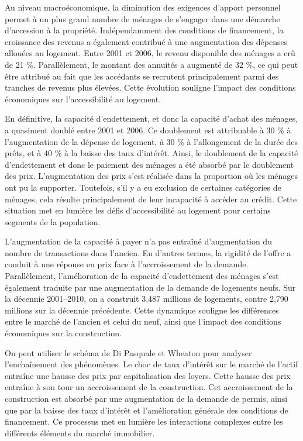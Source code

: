 \documentclass[a4paper, 12pt]{report}
\begin{document}
Au niveau macroéconomique, la diminution des exigences d'apport personnel permet à un plus grand nombre de ménages de s'engager dans une démarche d'accession à la propriété. Indépendamment des conditions de financement, la croissance des revenus a également contribué à une augmentation des dépenses allouées au logement. Entre 2001 et 2006, le revenu disponible des ménages a crû de 21 \%. Parallèlement, le montant des annuités a augmenté de 32 \%, ce qui peut être attribué au fait que les accédants se recrutent principalement parmi des tranches de revenus plus élevées. Cette évolution souligne l'impact des conditions économiques sur l'accessibilité au logement.


En définitive, la capacité d'endettement, et donc la capacité d'achat des ménages, a quasiment doublé entre 2001 et 2006. Ce doublement est attribuable à 30 \% à l'augmentation de la dépense de logement, à 30 \% à l'allongement de la durée des prêts, et à 40 \% à la baisse des taux d'intérêt. Ainsi, le doublement de la capacité d'endettement et donc le paiement des ménages a été absorbé par le doublement des prix. L'augmentation des prix s'est réalisée dans la proportion où les ménages ont pu la supporter. Toutefois, s'il y a eu exclusion de certaines catégories de ménages, cela résulte principalement de leur incapacité à accéder au crédit. Cette situation met en lumière les défis d'accessibilité au logement pour certains segments de la population.

L'augmentation de la capacité à payer n'a pas entraîné d'augmentation du nombre de transactions dans l'ancien. En d'autres termes, la rigidité de l'offre a conduit à une réponse en prix face à l'accroissement de la demande. Parallèlement, l'amélioration de la capacité d'endettement des ménages s'est également traduite par une augmentation de la demande de logements neufs. Sur la décennie 2001–2010, on a construit 3,487 millions de logements, contre 2,790 millions sur la décennie précédente. Cette dynamique souligne les différences entre le marché de l'ancien et celui du neuf, ainsi que l'impact des conditions économiques sur la construction.

On peut utiliser le schéma de Di Pasquale et Wheaton pour analyser l'enchaînement des phénomènes. Le choc de taux d'intérêt sur le marché de l'actif entraîne une hausse des prix par capitalisation des loyers. Cette hausse des prix entraîne à son tour un accroissement de la construction. Cet accroissement de la construction est absorbé par une augmentation de la demande de permis, ainsi que par la baisse des taux d'intérêt et l'amélioration générale des conditions de financement. Ce processus met en lumière les interactions complexes entre les différents éléments du marché immobilier.
\end{document}

